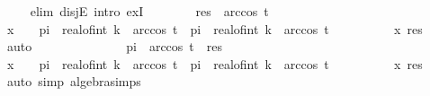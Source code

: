 \begin{isabellebody}
\ \ \ \ \isamarkupfalse%
{\isacharparenleft}{\kern0pt}elim\ disjE{\isacharsemicolon}{\kern0pt}\ intro\ exI{\isacharparenright}{\kern0pt}\isanewline
\ \ \ \ \ \ \isamarkupfalse%
\ {\isachardoublequoteopen}res\ {\isacharless}{\kern0pt}\ arccos\ t{\isachardoublequoteclose}\isanewline
\ \ \ \ \ \ \isamarkupfalse%
\ \isamarkupfalse%
\ {\isachardoublequoteopen}x\ {\isasymin}\ {\isacharbraceleft}{\kern0pt}{}\ {\isacharasterisk}{\kern0pt}\ pi\ {\isacharasterisk}{\kern0pt}\ real{\isacharunderscore}{\kern0pt}of{\isacharunderscore}{\kern0pt}int\ k\ {\isacharminus}{\kern0pt}\ arccos\ t{\isacharless}{\kern0pt}{\isachardot}{\kern0pt}{\isachardot}{\kern0pt}{\isacharless}{\kern0pt}{}\ {\isacharasterisk}{\kern0pt}\ pi\ {\isacharasterisk}{\kern0pt}\ real{\isacharunderscore}{\kern0pt}of{\isacharunderscore}{\kern0pt}int\ k\ {\isacharplus}{\kern0pt}\ arccos\ t{\isacharbraceright}{\kern0pt}{\isachardoublequoteclose}\isanewline
\ \ \ \ \ \ \ \ \isamarkupfalse%
\ x\ res\ \isamarkupfalse%
\ auto\isanewline
\ \ \ \ \isamarkupfalse%
\isanewline
\ \ \ \ \ \ \isamarkupfalse%
\ {\isachardoublequoteopen}{}\ {\isacharasterisk}{\kern0pt}\ pi\ {\isacharminus}{\kern0pt}\ arccos\ t\ {\isacharless}{\kern0pt}\ res{\isachardoublequoteclose}\isanewline
\ \ \ \ \ \ \isamarkupfalse%
\ \isamarkupfalse%
\ {\isachardoublequoteopen}x\ {\isasymin}\ {\isacharbraceleft}{\kern0pt}{}\ {\isacharasterisk}{\kern0pt}\ pi\ {\isacharasterisk}{\kern0pt}\ real{\isacharunderscore}{\kern0pt}of{\isacharunderscore}{\kern0pt}int\ {\isacharparenleft}{\kern0pt}k{\isacharplus}{\kern0pt}{}{\isacharparenright}{\kern0pt}\ {\isacharminus}{\kern0pt}\ arccos\ t{\isacharless}{\kern0pt}{\isachardot}{\kern0pt}{\isachardot}{\kern0pt}{\isacharless}{\kern0pt}{}\ {\isacharasterisk}{\kern0pt}\ pi\ {\isacharasterisk}{\kern0pt}\ real{\isacharunderscore}{\kern0pt}of{\isacharunderscore}{\kern0pt}int\ {\isacharparenleft}{\kern0pt}k{\isacharplus}{\kern0pt}{}{\isacharparenright}{\kern0pt}\ {\isacharplus}{\kern0pt}\ arccos\ t{\isacharbraceright}{\kern0pt}{\isachardoublequoteclose}\isanewline
\ \ \ \ \ \ \ \ \isamarkupfalse%
\ x\ res\ \isamarkupfalse%
\ {\isacharparenleft}{\kern0pt}auto\ simp{\isacharcolon}{\kern0pt}\ algebra{\isacharunderscore}{\kern0pt}simps{\isacharparenright}{\kern0pt}\isanewline
\ \ \ \ \isamarkupfalse%

\end{isabellebody}
